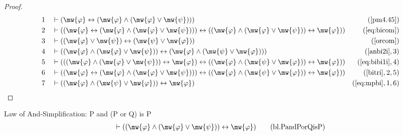 \begin{proof}
\begin{align}
  1 &&  & \vdash ( \mw{\varphi} \leftrightarrow ( \mw{\varphi} \wedge ( \mw{\varphi} \vee \mw{\psi} ) ) )&(\mbox{\ref{pm4.45}})\notag
  \\ 2 &&  & \vdash ( ( \mw{\varphi} \leftrightarrow ( \mw{\varphi} \wedge ( \mw{\varphi} \vee \mw{\psi} ) ) ) \leftrightarrow ( ( \mw{\varphi} \wedge ( \mw{\varphi} \vee \mw{\psi} ) ) \leftrightarrow \mw{\varphi} ) )&(\mbox{\ref{eq:bicom}})\notag
  \\ 3 &&  & \vdash ( ( \mw{\varphi} \vee \mw{\psi} ) \leftrightarrow ( \mw{\psi} \vee \mw{\varphi} ) )&(\mbox{\ref{orcom}})\notag
  \\ 4 &&  & \vdash ( ( \mw{\varphi} \wedge ( \mw{\varphi} \vee \mw{\psi} ) ) \leftrightarrow ( \mw{\varphi} \wedge ( \mw{\psi} \vee \mw{\varphi} ) ) )&(\mbox{\ref{anbi2i}},3)\notag
  \\ 5 &&  & \vdash ( ( ( \mw{\varphi} \wedge ( \mw{\varphi} \vee \mw{\psi} ) ) \leftrightarrow \mw{\varphi} ) \leftrightarrow ( ( \mw{\varphi} \wedge ( \mw{\psi} \vee \mw{\varphi} ) ) \leftrightarrow \mw{\varphi} ) )&(\mbox{\ref{eq:bibi1i}},4)\notag
  \\ 6 &&  & \vdash ( ( \mw{\varphi} \leftrightarrow ( \mw{\varphi} \wedge ( \mw{\varphi} \vee \mw{\psi} ) ) ) \leftrightarrow ( ( \mw{\varphi} \wedge ( \mw{\psi} \vee \mw{\varphi} ) ) \leftrightarrow \mw{\varphi} ) )&(\mbox{\ref{bitri}},2,5)\notag
  \\ 7 &&  & \vdash ( ( \mw{\varphi} \wedge ( \mw{\psi} \vee \mw{\varphi} ) ) \leftrightarrow \mw{\varphi} )&(\mbox{\ref{eq:mpbi}},1,6)\notag
\end{align}
\end{proof}

\begin{lemma} Law of And-Simplification: P and (P
or Q) is P
\begin{align}
\vdash ( ( \mw{\varphi} \wedge ( \mw{\varphi} \vee \mw{\psi} ) )
    \leftrightarrow \mw{\varphi} )\label{eq:bl.PandPorQisP}\tag{bl.PandPorQisP}
\end{align}
\end{lemma}


